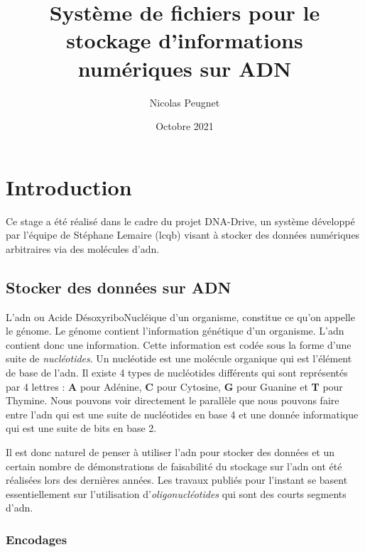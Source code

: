 \documentclass[a4paper]{report}
\title{Système de fichiers pour le stockage d’informations numériques sur ADN}
\date{Octobre 2021}
\author{Nicolas Peugnet}
\begin{document}
\maketitle

\tableofcontents

\chapter{Introduction}

Ce stage a été réalisé dans le cadre du projet DNA-Drive, un système développé par l'équipe de Stéphane Lemaire (\ac{lcqb}) visant à stocker des données numériques arbitraires via des molécules d'\ac{adn}.

\section{Stocker des données sur ADN}

L’\ac{adn} ou Acide DésoxyriboNucléique d’un organisme, constitue ce qu’on appelle le génome.
Le génome contient l’information génétique d’un organisme. L’\ac{adn} contient donc une information.
Cette information est codée sous la forme d’une suite de \emph{nucléotides}.
Un nucléotide est une molécule organique qui est l’élément de base de l’\ac{adn}.
Il existe 4 types de nucléotides différents qui sont représentés par 4 lettres : \textbf{A} pour Adénine, \textbf{C} pour Cytosine, \textbf{G} pour Guanine et \textbf{T} pour Thymine.
Nous pouvons voir directement le parallèle que nous pouvons faire entre l’\ac{adn} qui est une suite de nucléotides en base 4 et une donnée informatique qui est une suite de bits en base 2.

Il est donc naturel de penser à utiliser l’\ac{adn} pour stocker des données
et un certain nombre de démonstrations de faisabilité du stockage sur l’\ac{adn} ont été réalisées lors des dernières années.
Les travaux publiés pour l’instant se basent essentiellement sur l’utilisation d’\emph{oligonucléotides} qui sont des courts segments d’\ac{adn}.

\subsection{Encodages}
\end{document}
